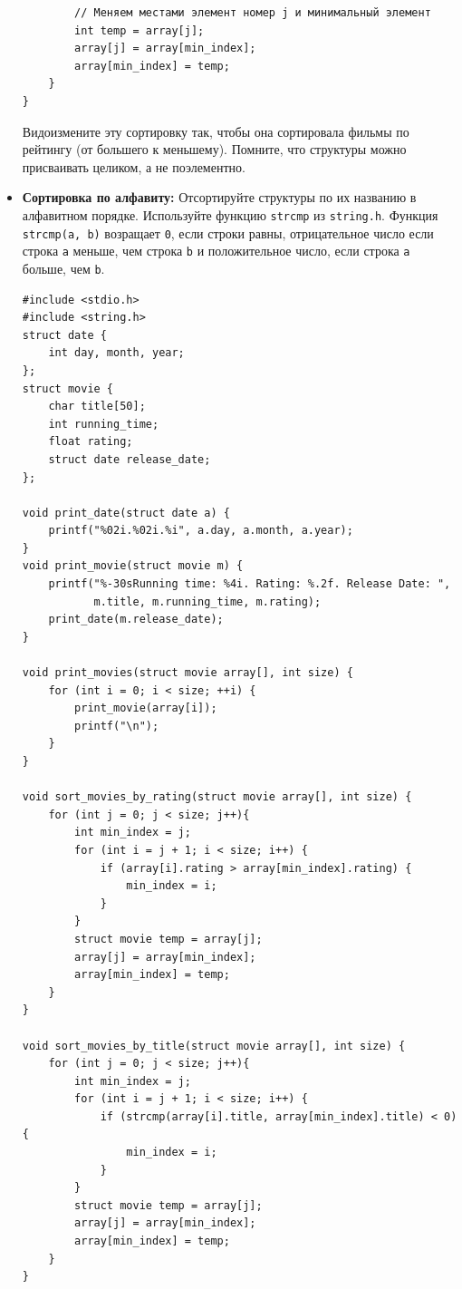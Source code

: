 \documentclass{article}
\begin{document}
\begin{itemize}
\begin{lstlisting}
        // Меняем местами элемент номер j и минимальный элемент
        int temp = array[j];
        array[j] = array[min_index];
        array[min_index] = temp;
    }
}
\end{lstlisting}
Видоизмените эту сортировку так, чтобы она сортировала фильмы по рейтингу (от большего к меньшему). Помните, что структуры можно присваивать целиком, а не поэлементно.

\item \textbf{Сортировка по алфавиту:} Отсортируйте структуры по их названию в алфавитном порядке. Используйте функцию \texttt{strcmp} из \texttt{string.h}. Функция \texttt{strcmp(a, b)} возращает \texttt{0}, если строки равны, отрицательное число если строка \texttt{a} меньше, чем строка \texttt{b} и положительное число, если строка \texttt{a} больше, чем \texttt{b}. 

\begin{lstlisting}[backgroundcolor = \color{solcolor}]
#include <stdio.h>
#include <string.h>
struct date {
    int day, month, year;
};
struct movie {
    char title[50];
    int running_time;
    float rating;
    struct date release_date;
};

void print_date(struct date a) {
    printf("%02i.%02i.%i", a.day, a.month, a.year);
}
void print_movie(struct movie m) {
    printf("%-30sRunning time: %4i. Rating: %.2f. Release Date: ", 
           m.title, m.running_time, m.rating);
    print_date(m.release_date);
}

void print_movies(struct movie array[], int size) {
    for (int i = 0; i < size; ++i) {
        print_movie(array[i]);
        printf("\n");
    }
}

void sort_movies_by_rating(struct movie array[], int size) {
    for (int j = 0; j < size; j++){
        int min_index = j;
        for (int i = j + 1; i < size; i++) {
            if (array[i].rating > array[min_index].rating) {
                min_index = i;
            }
        }
        struct movie temp = array[j];
        array[j] = array[min_index];
        array[min_index] = temp;
    }
}

void sort_movies_by_title(struct movie array[], int size) {
    for (int j = 0; j < size; j++){
        int min_index = j;
        for (int i = j + 1; i < size; i++) {
            if (strcmp(array[i].title, array[min_index].title) < 0) {
                min_index = i;
            }
        }
        struct movie temp = array[j];
        array[j] = array[min_index];
        array[min_index] = temp;
    }
}


\end{lstlisting}
\end{itemize}
\end{document}
